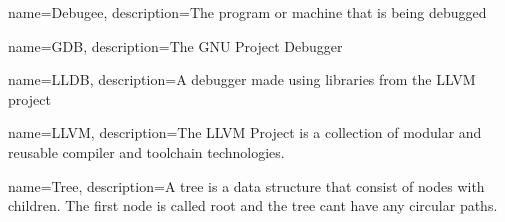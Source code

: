 {
    name=Debugee,
    description={The program or machine that is being debugged}
}

{
    name=GDB,
    description={The GNU Project Debugger}
}

{
    name=LLDB,
    description={A debugger made using libraries from the LLVM project}
}

{
    name=LLVM,
    description={The LLVM Project is a collection of modular and reusable compiler and toolchain technologies.}
}

{
    name=Tree,
    description={A tree is a data structure that consist of nodes with children. The first node is called root and the tree cant have any circular paths.}
}





